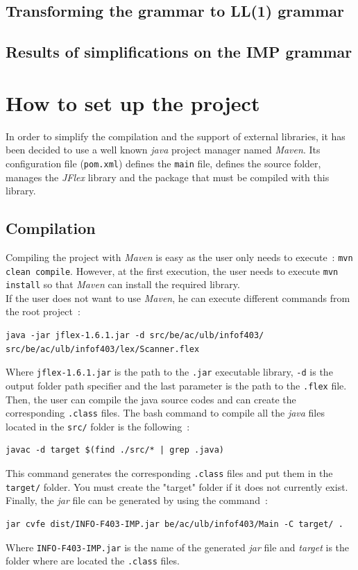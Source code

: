 \documentclass[a4paper,11pt]{article}
\begin{document}
  \subsection{Transforming the grammar to LL(1) grammar}
  
  \subsection{Results of simplifications on the IMP grammar}

\section{How to set up the project}
  In order to simplify the compilation and the support of external libraries, it has been decided to use a well known \textit{java} project manager named \textit{Maven}. Its configuration file (\verb|pom.xml|) defines the \verb|main| file, defines the source folder, manages the \textit{JFlex} library and the package that must be compiled with this library.
  \subsection{Compilation}
    Compiling the project with \textit{Maven} is easy as the user only needs to execute~: \verb|mvn clean compile|. However, at the first execution, the user needs to execute \verb|mvn install| so that \textit{Maven} can install the required library.\\
    If the user does not want to use \textit{Maven}, he can execute different commands from the root project~:
    \begin{verbatim}
java -jar jflex-1.6.1.jar -d src/be/ac/ulb/infof403/ src/be/ac/ulb/infof403/lex/Scanner.flex
    \end{verbatim}
    Where \verb|jflex-1.6.1.jar| is the path to the \verb|.jar| executable library,  \verb|-d| is the output folder path specifier and the last parameter is the path to the \verb|.flex| file.\\
    Then, the user can compile the java source codes and can create the corresponding \verb|.class| files. The bash command to compile all the \textit{java} files located in the \verb|src/| folder is the following~:
    \begin{verbatim}
javac -d target $(find ./src/* | grep .java)
    \end{verbatim}
    This command generates the corresponding \verb|.class| files and put them in the \verb|target/| folder. You must create the "target" folder if it does not currently exist. Finally, the \textit{jar} file can be generated by using the command~:
    \begin{verbatim}
jar cvfe dist/INFO-F403-IMP.jar be/ac/ulb/infof403/Main -C target/ .
    \end{verbatim}
    Where \verb|INFO-F403-IMP.jar| is the name of the generated \textit{jar} file and \textit{target} is the folder where are located the \verb|.class| files.
    
\end{document}
